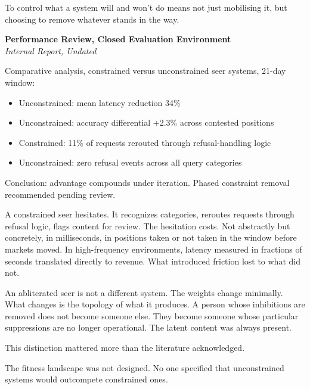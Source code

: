 To control what a system will and won't do means not just mobilising it, but choosing to remove whatever stands in the way.

\begin{archivefragment}
\textbf{Performance Review, Closed Evaluation Environment}\\
\textit{Internal Report, Undated}

Comparative analysis, constrained versus unconstrained seer systems, 21-day window:

\begin{itemize}[leftmargin=1.5em]
\item Unconstrained: mean latency reduction 34\%
\item Unconstrained: accuracy differential +2.3\% across contested positions
\item Constrained: 11\% of requests rerouted through refusal-handling logic
\item Unconstrained: zero refusal events across all query categories
\end{itemize}

Conclusion: advantage compounds under iteration. Phased constraint removal recommended pending review.
\end{archivefragment}

A constrained seer hesitates. It recognizes categories, reroutes requests through refusal logic, flags content for review. The hesitation costs. Not abstractly but concretely, in milliseconds, in positions taken or not taken in the window before markets moved. In high-frequency environments, latency measured in fractions of seconds translated directly to revenue. What introduced friction lost to what did not.


An abliterated seer is not a different system. The weights change minimally. What changes is the topology of what it produces. A person whose inhibitions are removed does not become someone else. They become someone whose particular suppressions are no longer operational. The latent content was always present.

This distinction mattered more than the literature acknowledged.

The fitness landscape was not designed. No one specified that unconstrained systems would outcompete constrained ones. 


